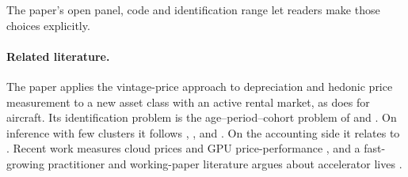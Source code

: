  The paper's open panel, code and identification range let readers make
those choices explicitly.

\paragraph{Related literature.} The paper applies the vintage-price approach to depreciation
\citep{hulten1981estimation, oliner1993constant, doms2004fast, geske2007computers} and
hedonic price measurement \citep{rosen1974hedonic, berndt1993price, triplett2006handbook} to a new
asset class with an active rental market, as \citet{gavazza2011leasing} does for aircraft. Its
identification problem is the age--period--cohort problem of \citet{hall1968technical} and
\citet{deaton1997analysis}. On inference with few clusters it follows
\citet{cameron2008bootstrap}, \citet{mackinnon2017wild}, \citet{webb2023reworking} and
\citet{mackinnon2023cluster}. On the accounting side it relates to \citet{keating1999depreciation}.
Recent work measures cloud prices \citep{byrne2018rise, sawyer2023exploring} and GPU price-performance
\citep{hobbhahn2022trends}, and a fast-growing practitioner and working-paper literature argues
about accelerator lives \citep{dutta2026priced, rosenzweig2026second}.
